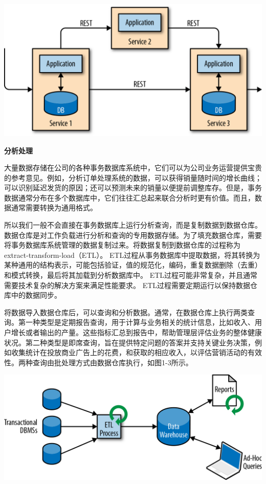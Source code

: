 \documentclass[oneside]{ctexbook}
\begin{document}
\noindent\includegraphics[width=\textwidth]{images/spaf_0102.png}

\textbf{分析处理}

大量数据存储在公司的各种事务数据库系统中，它们可以为公司业务运营提供宝贵的参考意见。例如，分析订单处理系统的数据，可以获得销量随时间的增长曲线；可以识别延迟发货的原因；还可以预测未来的销量以便提前调整库存。但是，事务数据通常分布在多个数据库中，它们往往汇总起来联合分析时更有价值。而且，数据通常需要转换为通用格式。

所以我们一般不会直接在事务数据库上运行分析查询，而是复制数据到数据仓库。数据仓库是对工作负载进行分析和查询的专用数据存储。为了填充数据仓库，需要将事务数据库系统管理的数据复制过来。将数据复制到数据仓库的过程称为extract-transform-load（ETL）。 ETL过程从事务数据库中提取数据，将其转换为某种通用的结构表示，可能包括验证，值的规范化，编码，重复数据删除（去重）和模式转换，最后将其加载到分析数据库中。 ETL过程可能非常复杂，并且通常需要技术复杂的解决方案来满足性能要求。 ETL过程需要定期运行以保持数据仓库中的数据同步。

将数据导入数据仓库后，可以查询和分析数据。通常，在数据仓库上执行两类查询。第一种类型是定期报告查询，用于计算与业务相关的统计信息，比如收入、用户增长或者输出的产量。这些指标汇总到报告中，帮助管理层评估业务的整体健康状况。第二种类型是即席查询，旨在提供特定问题的答案并支持关键业务决策，例如收集统计在投放商业广告上的花费，和获取的相应收入，以评估营销活动的有效性。两种查询由批处理方式由数据仓库执行，如图1-3所示。

\noindent\includegraphics[]{images/spaf_0103.png}
\end{document}
